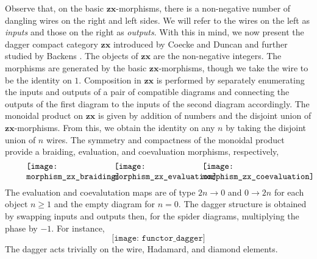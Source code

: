 \documentclass[a4paper,UKenglish]{lipics-v2016}
\begin{document}
Observe that, on the basic $\mathbf{zx}$-morphisms, there is a non-negative number of dangling wires on the right and left sides. We will refer to the wires on the left as \emph{inputs} and those on the right as \emph{outputs}. With this in mind, we now present the dagger compact category $\mathbf{zx}$ introduced by Coecke and Duncan \cite{CoeckeDuncan_QuantumObsFullPaper} and further studied by Backens \cite{Backens_Completeness}. The objects of $\mathbf{zx}$ are the non-negative integers.  The morphisms are generated by the basic $\mathbf{zx}$-morphisms, though we take the wire to be the identity on $1$.  Composition in $\mathbf{zx}$ is performed by separately enumerating the inputs and outputs of a pair of compatible diagrams  and connecting the outputs of the first diagram to the inputs of the second diagram accordingly.  The monoidal product on $\mathbf{zx}$ is given by addition of numbers and the disjoint union of $\mathbf{zx}$-morphisms. From this, we obtain the identity on any $n$ by taking the disjoint union of $n$ wires. The symmetry and compactness of the monoidal product provide a braiding, evaluation, and coevaluation morphisms, respectively,
\[
	\begin{minipage}{0.3\textwidth}
		\texttt{[image: morphism\_zx\_braiding]}
	\end{minipage}
	\begin{minipage}{0.3\textwidth}
		\texttt{[image: morphism\_zx\_evaluation]}
	\end{minipage}
	\begin{minipage}{0.3\textwidth}
		\texttt{[image: morphism\_zx\_coevaluation]}
	\end{minipage}
\]
The evaluation and coevalutation maps are of type $2n \to 0$ and $0 \to 2n$ for each object $n \geq 1$ and the empty diagram for $n=0$.  The dagger structure is obtained by swapping inputs and outputs then, for the spider diagrams, multiplying the phase by $-1$.  For instance, 
\[
\texttt{[image: functor\_dagger]}
\]
The dagger acts trivially on the wire, Hadamard, and diamond elements. 
\end{document}
